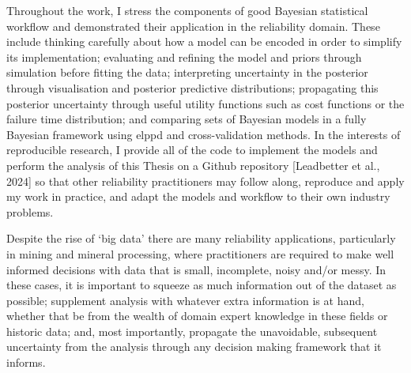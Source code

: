 Throughout the work, I stress the components of good Bayesian statistical workflow and demonstrated their application in the reliability domain. These include thinking carefully about how a model can be encoded in order to simplify its implementation; evaluating and refining the model and priors through simulation before fitting the data; interpreting uncertainty in the posterior through visualisation and posterior predictive distributions; propagating this posterior uncertainty through useful utility functions such as cost functions or the failure time distribution; and comparing sets of Bayesian models in a fully Bayesian framework using elppd and cross-validation methods. In the interests of reproducible research, I provide all of the code to implement the models and perform the analysis of this Thesis on a Github repository [Leadbetter et al., 2024] so that other reliability practitioners may follow along, reproduce and apply my work in practice, and adapt the models and workflow to their own industry problems.

Despite the rise of `big data' there are many reliability applications, particularly in mining and mineral processing, where practitioners are required to make well informed decisions with data that is small, incomplete, noisy and/or messy. In these cases, it is important to squeeze as much information out of the dataset as possible; supplement analysis with whatever extra information is at hand, whether that be from the wealth of domain expert knowledge in these fields or historic data; and, most importantly, propagate the unavoidable, subsequent uncertainty from the analysis through any decision making framework that it informs.

